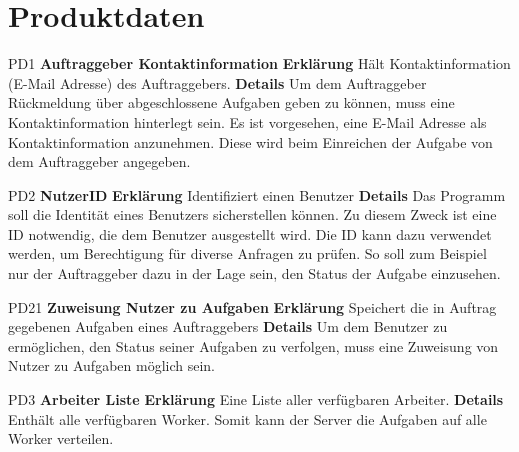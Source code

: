 \documentclass[a4paper,12pt]{article}
\begin{document}
\section{Produktdaten}
\begin{itemize}[nosep]
\leftskip=0.5cm

\begin{minipage}[t]{\linewidth}
\item[PD1] \textbf{Auftraggeber Kontaktinformation}
\subitem \textbf{Erklärung} Hält Kontaktinformation (E-Mail Adresse) des Auftraggebers.
\subitem \textbf{Details} Um dem Auftraggeber Rückmeldung über abgeschlossene Aufgaben geben zu können, muss eine Kontaktinformation hinterlegt sein.\newline
Es ist vorgesehen, eine E-Mail Adresse als Kontaktinformation anzunehmen. Diese wird beim Einreichen der Aufgabe von dem Auftraggeber angegeben.
\end{minipage}
\vspace{20mm}

\begin{minipage}[t]{\linewidth}
\item[PD2] \textbf{NutzerID}
\subitem \textbf{Erklärung} Identifiziert einen Benutzer
\subitem \textbf{Details} Das Programm soll die Identität eines Benutzers sicherstellen können. Zu diesem Zweck ist eine ID notwendig, die dem Benutzer ausgestellt wird.\newline
Die ID kann dazu verwendet werden, um Berechtigung für diverse Anfragen zu prüfen. So soll zum Beispiel nur der Auftraggeber dazu in der Lage sein, den Status der Aufgabe einzusehen.
\end{minipage}
\vspace{20mm}

\begin{minipage}[t]{\linewidth}
\item[PD21] \textbf{Zuweisung Nutzer zu Aufgaben}
\subitem \textbf{Erklärung} Speichert die in Auftrag gegebenen Aufgaben eines Auftraggebers
\subitem \textbf{Details} Um dem Benutzer zu ermöglichen, den Status seiner Aufgaben zu verfolgen, muss eine Zuweisung von Nutzer zu Aufgaben möglich sein.
\end{minipage}
\vspace{20mm}

\begin{minipage}[t]{\linewidth}
\item[PD3] \textbf{Arbeiter Liste}
\subitem \textbf{Erklärung} Eine Liste aller verfügbaren Arbeiter.
\subitem \textbf{Details} Enthält alle verfügbaren Worker.\newline
Somit kann der Server die Aufgaben auf alle Worker verteilen.
\end{minipage}
\vspace{20mm}


\end{itemize}
\end{document}
